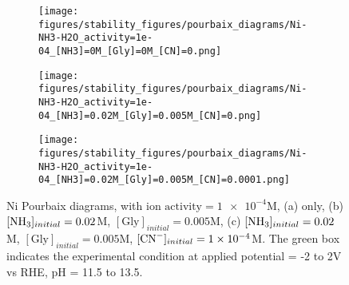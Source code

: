 \documentclass[journal=jacsat,manuscript=article]{achemso}
\begin{document}

\begin{figure}[htbp]
    \centering
    \begin{subfigure}[b]{0.32\textwidth}
        \subcaption{}\label{fig:Ni_Pourbaix_H2O}
        \texttt{[image: figures/stability\_figures/pourbaix\_diagrams/Ni-NH3-H2O\_activity=1e-04\_[NH3]=0M\_[Gly]=0M\_[CN]=0.png]}
    \end{subfigure}
    \hfill
    \begin{subfigure}[b]{0.32\textwidth}
        \subcaption{}\label{fig:Ni_Pourbaix_NH3_Gly}
        \texttt{[image: figures/stability\_figures/pourbaix\_diagrams/Ni-NH3-H2O\_activity=1e-04\_[NH3]=0.02M\_[Gly]=0.005M\_[CN]=0.png]}
    \end{subfigure}
    \hfill
    \begin{subfigure}[b]{0.32\textwidth}
        \subcaption{}\label{fig:Ni_Pourbaix_NH3_Gly_CN}
        \texttt{[image: figures/stability\_figures/pourbaix\_diagrams/Ni-NH3-H2O\_activity=1e-04\_[NH3]=0.02M\_[Gly]=0.005M\_[CN]=0.0001.png]}
    \end{subfigure}
    \caption{Ni Pourbaix diagrams, with $\text{ion activity}=\num{1e-4}$M, (a)  only, (b) $[\ce{NH3}]_{initial}= 0.02$M, $[\text{Gly}]_{initial}=0.005$M, (c) $[\ce{NH3}]_{initial}= 0.02$M, $[\text{Gly}]_{initial}=0.005$M,  $[\ce{CN-}]_{initial}=\num{1e-4}$M. The green box indicates the experimental condition at applied potential = -2 to 2V vs RHE, pH = 11.5 to 13.5.}
    \label{fig:Ni_Pourbaix}
\end{figure}
\end{document}
